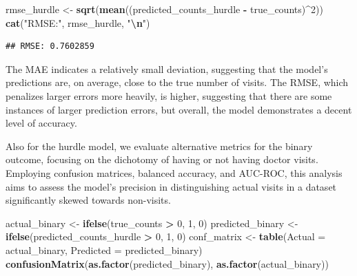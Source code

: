 \documentclass[
]{article}
\newenvironment{Shaded}{\begin{snugshade}}{\end{snugshade}}
\newcommand{\AttributeTok}[1]{\textcolor[rgb]{0.13,0.29,0.53}{#1}}
\newcommand{\DecValTok}[1]{\textcolor[rgb]{0.00,0.00,0.81}{#1}}
\newcommand{\FunctionTok}[1]{\textcolor[rgb]{0.13,0.29,0.53}{\textbf{#1}}}
\newcommand{\NormalTok}[1]{#1}
\newcommand{\OtherTok}[1]{\textcolor[rgb]{0.56,0.35,0.01}{#1}}
\newcommand{\SpecialCharTok}[1]{\textcolor[rgb]{0.81,0.36,0.00}{\textbf{#1}}}
\newcommand{\StringTok}[1]{\textcolor[rgb]{0.31,0.60,0.02}{#1}}
\begin{document}
\begin{Shaded}
\begin{Highlighting}[]
\NormalTok{rmse\_hurdle }\OtherTok{\textless{}{-}} \FunctionTok{sqrt}\NormalTok{(}\FunctionTok{mean}\NormalTok{((predicted\_counts\_hurdle }\SpecialCharTok{{-}}\NormalTok{ true\_counts)}\SpecialCharTok{\^{}}\DecValTok{2}\NormalTok{))}
\FunctionTok{cat}\NormalTok{(}\StringTok{"RMSE:"}\NormalTok{, rmse\_hurdle, }\StringTok{"}\SpecialCharTok{\textbackslash{}n}\StringTok{"}\NormalTok{)}
\end{Highlighting}
\end{Shaded}

\begin{verbatim}
## RMSE: 0.7602859
\end{verbatim}

The MAE indicates a relatively small deviation, suggesting that the
model's predictions are, on average, close to the true number of visits.
The RMSE, which penalizes larger errors more heavily, is higher,
suggesting that there are some instances of larger prediction errors,
but overall, the model demonstrates a decent level of accuracy.

Also for the hurdle model, we evaluate alternative metrics for the
binary outcome, focusing on the dichotomy of having or not having doctor
visits. Employing confusion matrices, balanced accuracy, and AUC-ROC,
this analysis aims to assess the model's precision in distinguishing
actual visits in a dataset significantly skewed towards non-visits.

\begin{Shaded}
\begin{Highlighting}[]
\NormalTok{actual\_binary }\OtherTok{\textless{}{-}} \FunctionTok{ifelse}\NormalTok{(true\_counts }\SpecialCharTok{\textgreater{}} \DecValTok{0}\NormalTok{, }\DecValTok{1}\NormalTok{, }\DecValTok{0}\NormalTok{)}
\NormalTok{predicted\_binary }\OtherTok{\textless{}{-}} \FunctionTok{ifelse}\NormalTok{(predicted\_counts\_hurdle }\SpecialCharTok{\textgreater{}} \DecValTok{0}\NormalTok{, }\DecValTok{1}\NormalTok{, }\DecValTok{0}\NormalTok{)}
\NormalTok{conf\_matrix }\OtherTok{\textless{}{-}} \FunctionTok{table}\NormalTok{(}\AttributeTok{Actual =}\NormalTok{ actual\_binary, }\AttributeTok{Predicted =}\NormalTok{ predicted\_binary)}
\FunctionTok{confusionMatrix}\NormalTok{(}\FunctionTok{as.factor}\NormalTok{(predicted\_binary), }\FunctionTok{as.factor}\NormalTok{(actual\_binary))}
\end{Highlighting}
\end{Shaded}
\end{document}
